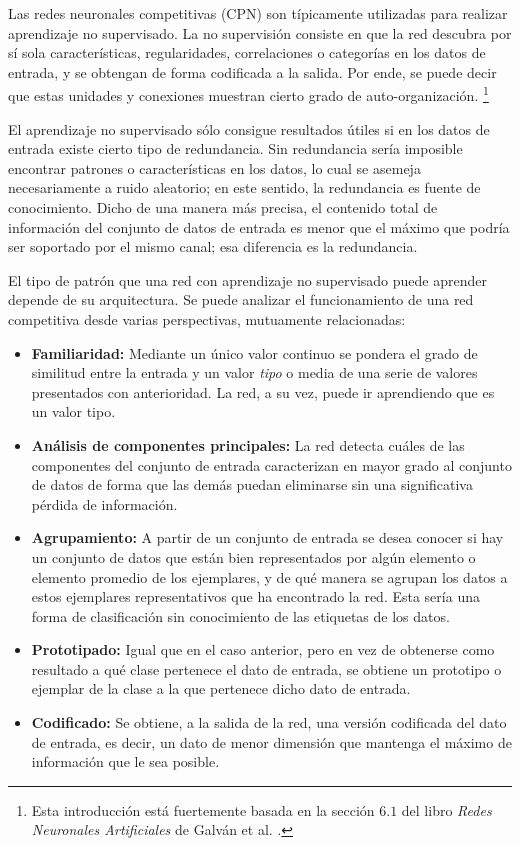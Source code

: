 Las redes neuronales competitivas (CPN) son típicamente utilizadas para realizar aprendizaje no supervisado. La no supervisión consiste en que la red descubra por sí sola características, regularidades, correlaciones o categorías en los datos de entrada, y se obtengan de forma codificada a la salida. Por ende, se puede decir que estas unidades y conexiones muestran cierto grado de auto-organización. \footnote{Esta introducción está fuertemente basada en la sección $6.1$ del libro \textit{Redes Neuronales Artificiales} de Galván et al. \cite{galvan2004}. }

El aprendizaje no supervisado sólo consigue resultados útiles si en los datos de entrada existe cierto tipo de redundancia. Sin redundancia sería imposible encontrar patrones o características en los datos, lo cual se asemeja necesariamente a ruido aleatorio; en este sentido, la redundancia es fuente de conocimiento. Dicho de una manera más precisa, el contenido total de información del conjunto de datos de entrada es menor que el máximo que podría ser soportado por el mismo canal; esa diferencia es la redundancia.

El tipo de patrón que una red con aprendizaje no supervisado puede aprender depende de su arquitectura. Se puede analizar  el funcionamiento de una red competitiva desde varias perspectivas, mutuamente relacionadas:

\begin{itemize}

\item \textbf{Familiaridad:} Mediante un único valor continuo se pondera el grado de similitud entre la entrada y un valor \textit{tipo} o media de una serie de valores presentados con anterioridad. La red, a su vez, puede ir aprendiendo que es un valor tipo.

\item \textbf{Análisis de componentes principales:} La red detecta cuáles de las componentes del conjunto de entrada caracterizan en mayor grado al conjunto de datos de forma que las demás puedan eliminarse sin una significativa pérdida de información.

\item \textbf{Agrupamiento:} A partir de un conjunto de entrada se desea conocer si hay un conjunto de datos que están bien representados por algún elemento  o elemento promedio de los ejemplares, y de qué manera se agrupan los datos a estos ejemplares representativos que ha encontrado la red. Esta sería una forma de clasificación sin conocimiento de las etiquetas de los datos.

\item \textbf{Prototipado:} Igual que en el caso anterior, pero en vez de obtenerse como resultado a qué clase pertenece el dato de entrada, se obtiene un prototipo o ejemplar de la clase a la que pertenece dicho dato de entrada. 

\item \textbf{Codificado:} Se obtiene, a la salida de la red, una versión codificada del dato de entrada, es decir, un dato de menor dimensión que mantenga el máximo de información que le sea posible. 
\end{itemize}

